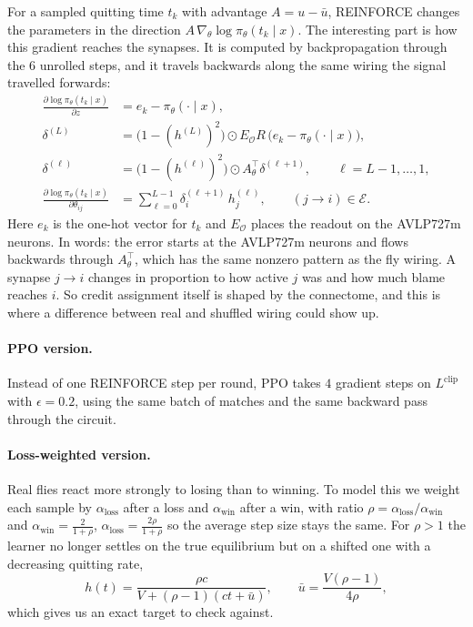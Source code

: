 \documentclass{article}
\newcommand{\Eset}{\mathcal{E}}
\newcommand{\Out}{\mathcal{O}}
\begin{document}
For a sampled quitting time $t_k$ with advantage $A = u - \bar u$, REINFORCE changes the parameters in the direction $A\,\nabla_\theta \log \pi_\theta(t_k \mid x)$. The interesting part is how this gradient reaches the synapses. It is computed by backpropagation through the 6 unrolled steps, and it travels backwards along the same wiring the signal travelled forwards:
\begin{align*}
\frac{\partial \log \pi_\theta(t_k\mid x)}{\partial z} &= e_k - \pi_\theta(\cdot \mid x), \\
\delta^{(L)} &= \big(1 - (h^{(L)})^2\big) \odot E_{\Out} R\,\big(e_k - \pi_\theta(\cdot\mid x)\big), \\
\delta^{(\ell)} &= \big(1 - (h^{(\ell)})^2\big) \odot A_\theta^\top \delta^{(\ell+1)}, \qquad \ell = L-1, \dots, 1, \\
\frac{\partial \log \pi_\theta(t_k \mid x)}{\partial \theta_{ij}} &= \sum_{\ell = 0}^{L-1} \delta_i^{(\ell+1)}\, h_j^{(\ell)}, \qquad (j \to i) \in \Eset .
\end{align*}
Here $e_k$ is the one-hot vector for $t_k$ and $E_{\Out}$ places the readout on the AVLP727m neurons. In words: the error starts at the AVLP727m neurons and flows backwards through $A_\theta^\top$, which has the same nonzero pattern as the fly wiring. A synapse $j \to i$ changes in proportion to how active $j$ was and how much blame reaches $i$. So credit assignment itself is shaped by the connectome, and this is where a difference between real and shuffled wiring could show up.

\paragraph{PPO version.} Instead of one REINFORCE step per round, PPO takes $4$ gradient steps on $L^{\mathrm{clip}}$ with $\epsilon = 0.2$, using the same batch of matches and the same backward pass through the circuit.

\paragraph{Loss-weighted version.} Real flies react more strongly to losing than to winning. To model this we weight each sample by $\alpha_{\mathrm{loss}}$ after a loss and $\alpha_{\mathrm{win}}$ after a win, with ratio $\rho = \alpha_{\mathrm{loss}}/\alpha_{\mathrm{win}}$ and $\alpha_{\mathrm{win}} = \frac{2}{1+\rho}$, $\alpha_{\mathrm{loss}} = \frac{2\rho}{1+\rho}$ so the average step size stays the same. For $\rho > 1$ the learner no longer settles on the true equilibrium but on a shifted one with a decreasing quitting rate,
\[
h(t) = \frac{\rho c}{V + (\rho - 1)(ct + \bar u)}, \qquad \bar u = \frac{V(\rho - 1)}{4\rho},
\]
which gives us an exact target to check against.
\end{document}

